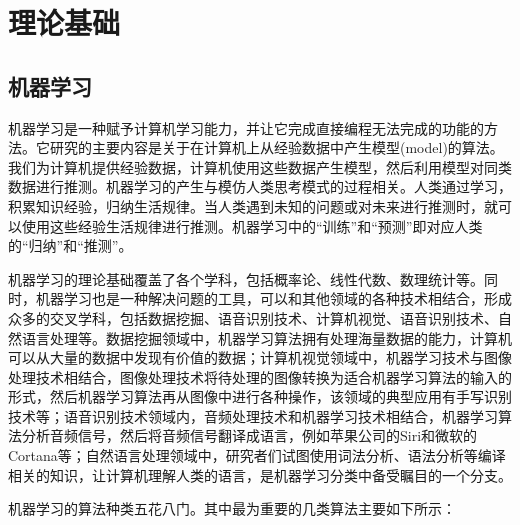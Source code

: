 
\chapter{理论基础}
\label{chap:preli}


\section{机器学习}

机器学习是一种赋予计算机学习能力，并让它完成直接编程无法完成的功能的方法。它研究的主要内容是关于在计算机上从经验数据中产生模型(model)的算法。我们为计算机提供经验数据，计算机使用这些数据产生模型，然后利用模型对同类数据进行推测。机器学习的产生与模仿人类思考模式的过程相关。人类通过学习，积累知识经验，归纳生活规律。当人类遇到未知的问题或对未来进行推测时，就可以使用这些经验生活规律进行推测。机器学习中的“训练”和“预测”即对应人类的“归纳”和“推测”。

机器学习的理论基础覆盖了各个学科，包括概率论、线性代数、数理统计等。同时，机器学习也是一种解决问题的工具，可以和其他领域的各种技术相结合，形成众多的交叉学科，包括数据挖掘、语音识别技术、计算机视觉、语音识别技术、自然语言处理等。数据挖掘领域中，机器学习算法拥有处理海量数据的能力，计算机可以从大量的数据中发现有价值的数据；计算机视觉领域中，机器学习技术与图像处理技术相结合，图像处理技术将待处理的图像转换为适合机器学习算法的输入的形式，然后机器学习算法再从图像中进行各种操作，该领域的典型应用有手写识别技术等；语音识别技术领域内，音频处理技术和机器学习技术相结合，机器学习算法分析音频信号，然后将音频信号翻译成语言，例如苹果公司的Siri和微软的Cortana等；自然语言处理领域中，研究者们试图使用词法分析、语法分析等编译相关的知识，让计算机理解人类的语言，是机器学习分类中备受瞩目的一个分支。

机器学习的算法种类五花八门。其中最为重要的几类算法主要如下所示：

